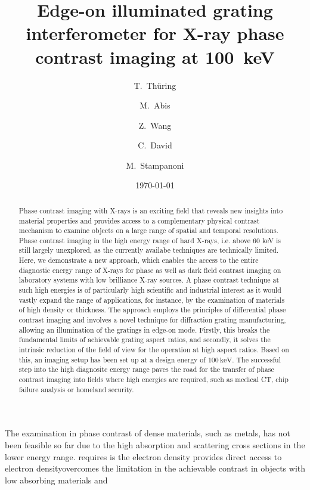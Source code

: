 \documentclass[aip,apl,amsmath,amssymb,floatfix,reprint,a4paper]{revtex4-1}
\newcommand{\unit}[1]{\ensuremath{\, \mathrm{#1}}}
\begin{document}
\title{Edge-on illuminated grating interferometer for X-ray phase contrast imaging at 100~keV}

\author{T.~Thüring}
\author{M.~Abis}
\author{Z.~Wang}
\author{C.~David}
\author{M.~Stampanoni}

\date{\today}


\begin{abstract}
Phase contrast imaging with X-rays is an exciting field that reveals new insights into material properties and provides access to a complementary physical contrast mechanism to examine objects on a large range of spatial and temporal resolutions. Phase contrast imaging in the high energy range of hard X-rays, i.e. above 60 keV is still largely unexplored, as the currently availabe techniques are technically limited. Here, we demonstrate a new approach, which enables the access to the entire diagnostic energy range of X-rays for phase as well as dark field contrast imaging on laboratory systems with low brilliance X-ray sources. A phase contrast technique at such high energies is of particularly high scientific and industrial interest as it would vastly expand the range of applications, for instance, by the examination of materials of high density or thickness. The approach employs the principles of differential phase contrast imaging and involves a novel technique for diffraction grating manufacturing, allowing an illumination of the gratings in edge-on mode. Firstly, this breaks the fundamental limits of achievable grating aspect ratios, and secondly, it solves the intrinsic reduction of the field of view for the operation at high aspect ratios. Based on this, an imaging setup has been set up at a design energy of $100 \unit{keV}$. The successful step into the high diagnositc energy range paves the road for the transfer of phase contrast imaging into fields where high energies are required, such as medical CT, chip failure analysis or homeland security.
\end{abstract}
The examination in phase contrast of dense materials, such as metals, has not been feasible so far due to the high absorption and scattering cross sections in the lower energy range.
requires  is the electron density  provides direct access to electron densityovercomes the limitation in the achievable contrast in objects with low absorbing materials and  
\maketitle
\end{document}
